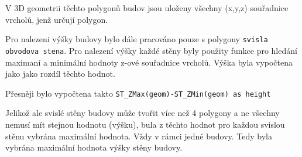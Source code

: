 V 3D geometrii těchto polygonů budov jsou uloženy všechny (x,y,z) souřadnice 
vrcholů, jenž určují polygon. 

Pro nalezeni výšky budovy bylo dále pracováno pouze s polygony 
{\tt svisla obvodova stena}. 
Pro nalezení výšky každé stěny byly použity funkce pro hledání 
maximaní a minimální hodnoty z-ové souřadnice vrcholů.
Výška byla vypočtena jako jako rozdíl těchto hodnot. 

Přesněji bylo vypočtena takto {\tt ST\_ZMax(geom)-ST\_ZMin(geom) as height} 

Jelikož ale svislé stěny budovy může tvořit více než 4 polygony a 
ne všechny nemusí mít stejnou hodnotu (výšku), bula z těchto hodnot 
pro každou svislou stěnu vybrána maximální hodnota. Vždy v rámci jedné budovy. 
Tedy byla vybrána maximální hodnota výšky stěny budovy.
